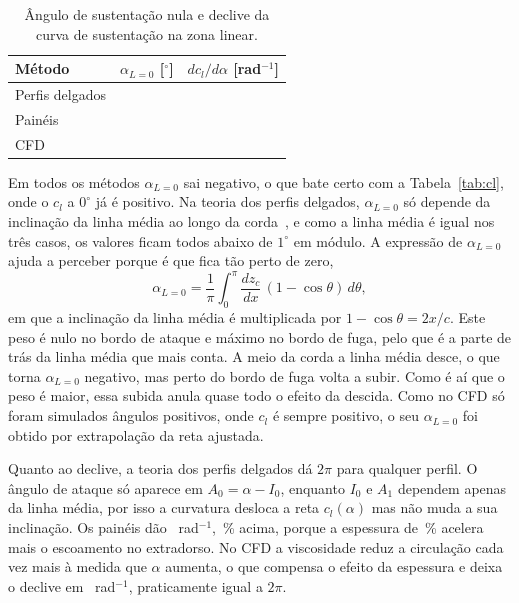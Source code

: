 \begin{table}[H]
  \centering
  \caption{Ângulo de sustentação nula e declive da curva de sustentação na zona
  linear.}
  \label{tab:alpha0}
  \begin{tabular}{lcc}
    \toprule
    Método & $\alpha_{L=0}$ [$^\circ$] & $dc_l/d\alpha$ [rad$^{-1}$] \\
    \midrule
    Perfis delgados & \Resultado{\AlphaZeroDelgados} & \Resultado{\DecliveDelgados} \\
    Painéis         & \Resultado{\AlphaZeroPaineis} & \Resultado{\DeclivePaineis} \\
    CFD             & \Resultado{\AlphaZeroCFD} & \Resultado{\DecliveCFD} \\
    \bottomrule
  \end{tabular}
\end{table}

Em todos os métodos $\alpha_{L=0}$ sai negativo, o que bate certo com a
Tabela~\ref{tab:cl}, onde o $c_l$ a $0^\circ$ já é positivo. Na teoria dos perfis
delgados, $\alpha_{L=0}$ só depende da inclinação da linha média ao longo da
corda~\cite{anderson}, e como a linha média é igual nos três casos, os valores
ficam todos abaixo de $1^\circ$ em módulo. A expressão de $\alpha_{L=0}$ ajuda a
perceber porque é que fica tão perto de zero,
\[
  \alpha_{L=0} = \frac{1}{\pi}\int_0^{\pi}\frac{dz_c}{dx}\,(1-\cos\theta)\,d\theta ,
\]
em que a inclinação da linha média é multiplicada por $1-\cos\theta = 2x/c$.
Este peso é nulo no bordo de ataque e máximo no bordo de fuga, pelo que é a
parte de trás da linha média que mais conta. A meio da corda a linha média
desce, o que torna $\alpha_{L=0}$ negativo, mas perto do bordo de fuga volta a
subir. Como é aí que o peso é maior, essa subida anula quase
todo o efeito da descida. Como no CFD só
foram simulados ângulos positivos, onde $c_l$ é sempre positivo, o seu
$\alpha_{L=0}$ foi obtido por extrapolação da reta ajustada.

Quanto ao declive, a teoria dos perfis delgados dá $2\pi$ para qualquer perfil.
O ângulo de ataque só aparece em $A_0 = \alpha - I_0$, enquanto $I_0$ e $A_1$
dependem apenas da linha média, por isso a curvatura desloca a reta
$c_l(\alpha)$ mas não muda a sua inclinação. Os painéis dão \Resultado{\DeclivePaineis}~rad$^{-1}$,
\Resultado[0]{\DifDeclivePct}\,\% acima, porque a espessura de \Resultado[0]{\EspessuraPct}\,\% acelera mais o escoamento no
extradorso. No CFD a viscosidade reduz a circulação cada vez mais à medida que
$\alpha$ aumenta, o que compensa o efeito da espessura e deixa o declive em
\Resultado{\DecliveCFD}~rad$^{-1}$, praticamente igual a $2\pi$. 

